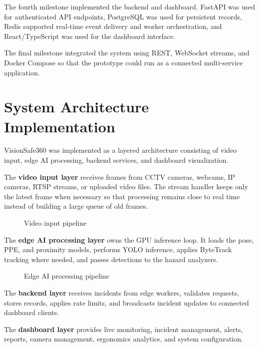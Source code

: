 The fourth milestone implemented the backend and dashboard. FastAPI was used for authenticated API endpoints, PostgreSQL was used for persistent records, Redis supported real-time event delivery and worker orchestration, and React/TypeScript was used for the dashboard interface.

The final milestone integrated the system using REST, WebSocket streams, and Docker Compose so that the prototype could run as a connected multi-service application.

\section{System Architecture Implementation}

VisionSafe360 was implemented as a layered architecture consisting of video input, edge AI processing, backend services, and dashboard visualization.

The \textbf{video input layer} receives frames from CCTV cameras, webcams, IP cameras, RTSP streams, or uploaded video files. The stream handler keeps only the latest frame when necessary so that processing remains close to real time instead of building a large queue of old frames.

\begin{figure}[H]
\centering
{}
\caption{Video input pipeline}
\end{figure}

The \textbf{edge AI processing layer} owns the GPU inference loop. It loads the pose, PPE, and proximity models, performs YOLO inference, applies ByteTrack tracking where needed, and passes detections to the hazard analyzers.

\begin{figure}[H]
\centering
{}
\caption{Edge AI processing pipeline}
\end{figure}

The \textbf{backend layer} receives incidents from edge workers, validates requests, stores records, applies rate limits, and broadcasts incident updates to connected dashboard clients.

The \textbf{dashboard layer} provides live monitoring, incident management, alerts, reports, camera management, ergonomics analytics, and system configuration.

